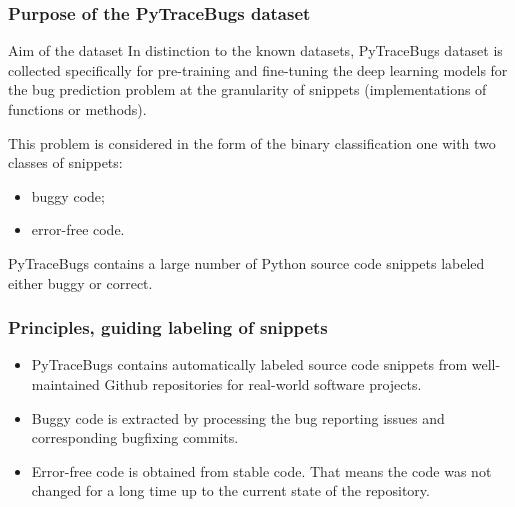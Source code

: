 \documentclass{beamer}
\begin{document}
\begin{frame}
\frametitle{Purpose of the PyTraceBugs dataset}

\begin{block}{Aim of the dataset}
In distinction to the known datasets, PyTraceBugs dataset is collected specifically for pre-training and fine-tuning the deep learning models for the bug prediction problem at the granularity of snippets (implementations of functions or methods). 

This problem is considered in the form of the binary classification one with two classes of snippets:
\begin{itemize}
\item buggy code; 
\item error-free code.
\end{itemize}
\end{block}


PyTraceBugs contains a large number of Python source code snippets labeled either buggy or correct.

\end{frame}


\begin{frame}
\frametitle{Principles, guiding labeling of snippets}

\begin{itemize}
\item PyTraceBugs contains automatically labeled source code snippets from well-maintained Github repositories for real-world software projects.
\item Buggy code is extracted by processing the bug reporting issues and corresponding bugfixing commits.
\item Error-free code is obtained from stable code. That means the code was not changed for a long time up to the current state of the repository.
\end{itemize}
\end{frame}
\end{document}
